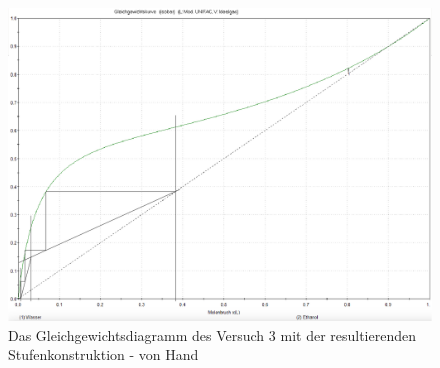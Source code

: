 \begin{figure}[h!]
	\centering
	\includegraphics[width=0.85\linewidth]{img/McCabe3(4Stufen)}
	\caption{Das Gleichgewichtsdiagramm des Versuch 3 mit der resultierenden Stufenkonstruktion - von Hand}
	\label{fig:McCabe3}
\end{figure}
\FloatBarrier


